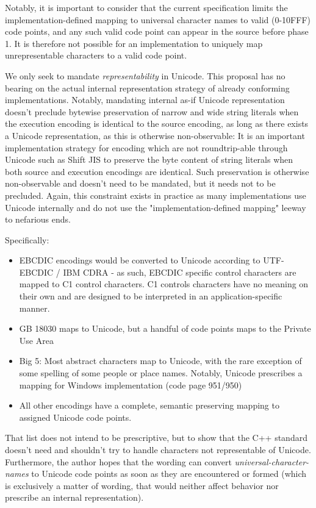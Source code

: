 \documentclass{wg21}
\begin{document}
Notably, it is important to consider that the current specification limits the implementation-defined mapping to universal character names to  valid (0-10FFF) code points,
and any such valid code point can appear in the source before phase 1.
It is therefore not possible for an implementation to uniquely map unrepresentable characters to a valid code point.

We only seek to mandate \emph{representability} in Unicode.
This proposal has no bearing on the actual internal representation strategy of already conforming implementations. Notably, mandating internal as-if Unicode representation doesn't
preclude bytewise preservation of narrow and wide string literals when the execution encoding is identical to the source encoding,  as long as there exists a Unicode representation,
as this is otherwise non-observable: It is an important implementation strategy for encoding which are not roundtrip-able through Unicode such as Shift JIS
to preserve the byte content of string literals when both source and execution encodings are identical.
Such preservation is otherwise non-observable and doesn't need to be mandated, but it needs not to be precluded.
Again, this constraint exists in practice as many implementations use Unicode internally and do not use the "implementation-defined mapping" leeway
to nefarious ends.


Specifically:
\begin{itemize}
    \item EBCDIC encodings would be converted to Unicode according to UTF-EBCDIC / IBM CDRA - as such, EBCDIC specific control characters are mapped to C1 control characters. C1 controls characters have no meaning on their own and are designed to be interpreted in an application-specific manner.
    \item GB 18030 maps to Unicode, but a handful of code points maps to the Private Use Area
    \item Big 5: Most abstract characters map to Unicode, with the rare exception of some spelling of some people or place names. Notably, Unicode prescribes a mapping for Windows implementation (code page 951/950)
    \item All other encodings have a complete, semantic preserving mapping to assigned Unicode code points.
\end{itemize}

That list does not intend to be prescriptive, but to show that the C++ standard doesn't need and shouldn't try to handle characters not representable of Unicode.
Furthermore, the author hopes that the wording can convert \emph{universal-character-names} to Unicode code points as soon as they are encountered or formed (which is exclusively a matter of wording,
that would neither affect behavior nor prescribe an internal representation).
\end{document}
